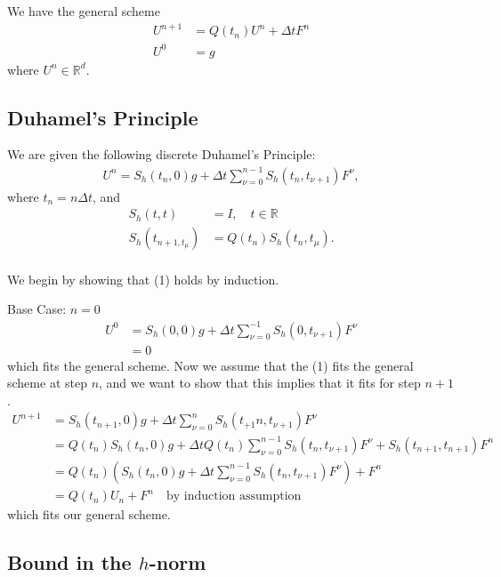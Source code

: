 We have the general scheme 
\begin{align*}
U^{n+1}  &= Q(t_n) U^n + \Delta t F^n \\
U^0 &= g
\end{align*}
where $U^n \in \mathbb{R}^d$. 

\subsection{Duhamel’s Principle}
We are given the following discrete Duhamel’s Principle:
\begin{align}
U^n = S_h(t_n,0)g+\Delta t \sum_{\nu = 0}^{n-1} S_h(t_n , t_{\nu + 1}) F^{\nu} , 
\end{align}
where $t_n = n \Delta t$, and 
\begin{align*}
S_h(t,t) &= I, \quad t \in \mathbb{R} \\
S_h(t_{n+1,t_{\mu}}) &= Q(t_n)S_h(t_n,t_{\mu}).
\end{align*}
\\
We begin by showing that (1) holds by induction.

Base Case: $n = 0$
\begin{align*}
U^0 &= S_h(0,0)g+\Delta t \sum_{\nu = 0}^{-1} S_h(0 , t_{\nu + 1}) F^{\nu} \\
& = 0
\end{align*}
which fits the general scheme. 
Now we assume that the (1) fits the general scheme at step $n$, and we want to show that this implies that it fits for step $n+1$.
\begin{align*}
U^{n+1} &= S_h(t_{n+1},0)g+\Delta t \sum_{\nu = 0}^{n} S_h(t_{+1}n , t_{\nu + 1}) F^{\nu} \\
&= Q(t_n)S_h(t_n,0)g + \Delta t Q(t_n) \sum_{\nu = 0}^{n-1} S_h(t_n , t_{\nu + 1}) F^{\nu} + S_h(t_{n+1} , t_{n + 1}) F^{n} \\ &= Q(t_n)(S_h(t_n,0)g + \Delta t \sum_{\nu = 0}^{n-1} S_h(t_n , t_{\nu + 1}) F^{\nu})+F^{n} \\ 
&= Q(t_n)U_n+F^{n} \quad \text{by induction assumption} 
\end{align*}
which fits our general scheme.
\subsection{Bound in the $h$-norm}